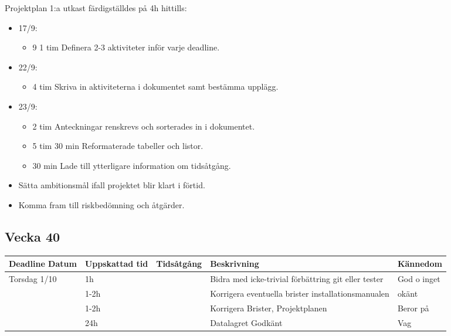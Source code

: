 \documentclass{TDP003mall}
\begin{document}
\begin{itemize}
	Projektplan 1:a utkast färdigställdes på 4h hittills:
\begin{itemize}
	\item 17/9:
	\begin{itemize}
		\item 9 1 tim Definera 2-3 aktiviteter inför varje deadline.
	\end{itemize}
	\item 22/9:
	\begin{itemize}
		\item 4 tim Skriva in aktiviteterna i dokumentet samt bestämma upplägg.
	\end{itemize}
	\item 23/9:
	\begin{itemize}
		\item 2 tim Anteckningar renskrevs och sorterades in i dokumentet.
		\item 5 tim 30 min Reformaterade tabeller och listor.
		\item 30 min Lade till ytterligare information om tidsåtgång.
	\end{itemize}
	\item Sätta ambitionsmål ifall projektet blir klart i förtid.
	\item Komma fram till riskbedömning och åtgärder.
\end{itemize}

\subsection{Vecka 40}
\begin{tabularx}{\linewidth}{|l|l|l|X|l|}
	\hline
	Deadline Datum & Uppskattad tid & Tidsåtgång & Beskrivning                                         & Kännedom    \\ [0.5ex]
	\hline
	Torsdag 1/10   & 1h             &            & Bidra med icke-trivial förbättring git eller tester & God o inget \\
	\hline
                   & 1-2h           &            & Korrigera eventuella brister installationsmanualen  & okänt       \\
	\hline
                   & 1-2h           &            & Korrigera Brister, Projektplanen                    & Beror på    \\
	\hline
                   & 24h            &            & Datalagret Godkänt                                  & Vag         \\
	\hline
\end{tabularx}{\linewidth}


\end{itemize}
\end{document}
